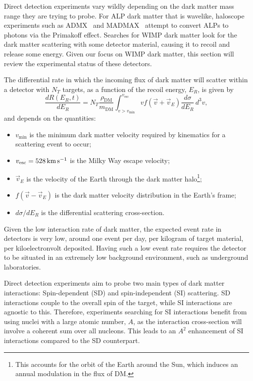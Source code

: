 Direct detection experiments vary wildly depending on the dark matter 
mass range they are trying to probe. For ALP dark matter that is wavelike, haloscope experiments 
such as ADMX~\cite{ADMX:2009iij} and MADMAX~\cite{MADMAX:2019pub_mar_Newexperimentalapproach} 
attempt to convert ALPs to photons via the Primakoff effect. 
Searches for WIMP dark matter look for the dark matter scattering with some detector
material, causing it to recoil and release some energy. Given our focus on WIMP dark matter, 
this section will review the experimental status of these detectors.

The differential rate in which the incoming flux of dark matter will scatter
within a detector with $N_T$ targets, as a function of the recoil energy, $E_R$,
is given by
\begin{equation}
    \frac{d R(E_R, t)}{dE_R} = N_T \frac{\rho_\mathrm{DM}}{m_\mathrm{DM}}\int_{v>v_\mathrm{min}}^{v_\mathrm{esc}}v f(\Vec{v} + \vec{v}_E)\frac{d\sigma}{dE_R}\,d^3v,
\end{equation}
 and depends on the quantities:
\begin{itemize}
    \item $v_\mathrm{min}$ is the minimum dark matter velocity required by kinematics for a scattering event to occur;
    \item $v_\mathrm{esc} = 528{\rm \,km}{\rm \,s}^{-1}$ is the Milky Way escape velocity;
    \item $\vec{v}_E$ is the velocity of the Earth through the dark matter halo\footnote{This accounts for the orbit of the Earth around the Sun, which induces an annual modulation in the flux of DM.};
    \item $f(\vec{v} - \vec{v}_E)$ is the dark matter velocity distribution in the Earth's frame;
    \item $d\sigma/dE_R$ is the differential scattering cross-section.
\end{itemize}
Given the low interaction rate of dark matter, the expected event rate in 
detectors is very low, around one event per day, per kilogram of target material, per kiloelectronvolt deposited.
Having such a low event rate requires the detector to be situated in 
an extremely low background environment, such as underground laboratories. 

Direct detection experiments aim to probe two main types of dark matter interactions:
Spin-dependent (SD) and spin-independent (SI) scattering. SD interactions couple
to the overall spin of the target, while SI interactions are agnostic to this.
Therefore, experiments searching for SI interactions benefit from using nuclei with a large atomic number, $A$,
as the interaction cross-section will involve a coherent sum over all nucleons.
This leads to an $A^2$ enhancement of SI interactions compared to the SD counterpart.

